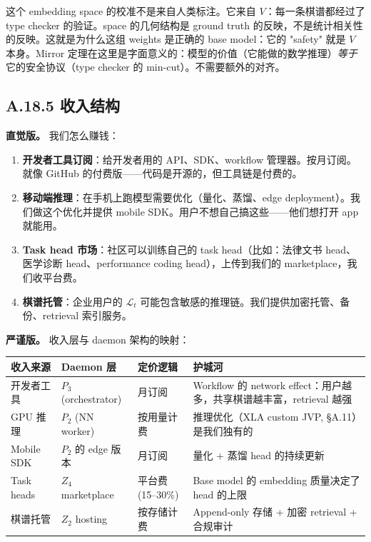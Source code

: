 \documentclass[11pt,a4paper]{article}
\theoremstyle{definition}
\theoremstyle{remark}
\begin{document}
这个 embedding space 的校准不是来自人类标注。它来自 $V$：每一条棋谱都经过了 type checker 的验证。space 的几何结构是 ground truth 的反映，不是统计相关性的反映。这就是为什么这组 weights 是正确的 base model：它的 "safety" 就是 $V$ 本身。Mirror 定理在这里是字面意义的：模型的价值（它能做的数学推理）\emph{等于}它的安全协议（type checker 的 min-cut）。不需要额外的对齐。


\subsection{A.18.5 收入结构}

\textbf{直觉版。}
我们怎么赚钱：
\begin{enumerate}[nosep]
  \item \textbf{开发者工具订阅}：给开发者用的 API、SDK、workflow 管理器。按月订阅。就像 GitHub 的付费版——代码是开源的，但工具链是付费的。
  \item \textbf{移动端推理}：在手机上跑模型需要优化（量化、蒸馏、edge deployment）。我们做这个优化并提供 mobile SDK。用户不想自己搞这些——他们想打开 app 就能用。
  \item \textbf{Task head 市场}：社区可以训练自己的 task head（比如：法律文书 head、医学诊断 head、performance coding head），上传到我们的 marketplace，我们收平台费。
  \item \textbf{棋谱托管}：企业用户的 $\mathcal{L}_t$ 可能包含敏感的推理链。我们提供加密托管、备份、retrieval 索引服务。
\end{enumerate}

\textbf{严谨版。}
收入层与 daemon 架构的映射：

\begin{center}
\small
\begin{tabularx}{\textwidth}{l l l X}
\toprule
\textbf{收入来源} & \textbf{Daemon 层} & \textbf{定价逻辑} & \textbf{护城河} \\
\midrule
开发者工具 & $P_3$ (orchestrator) & 月订阅 & Workflow 的 network effect：用户越多，共享棋谱越丰富，retrieval 越强 \\
GPU 推理 & $P_2$ (NN worker) & 按用量计费 & 推理优化（XLA custom JVP, \S A.11）是我们独有的 \\
Mobile SDK & $P_2$ 的 edge 版本 & 月订阅 & 量化 + 蒸馏 head 的持续更新 \\
Task heads & $Z_4$ marketplace & 平台费 (15--30\%) & Base model 的 embedding 质量决定了 head 的上限 \\
棋谱托管 & $Z_2$ hosting & 按存储计费 & Append-only 存储 + 加密 retrieval + 合规审计 \\
\bottomrule
\end{tabularx}
\end{center}
\end{document}
